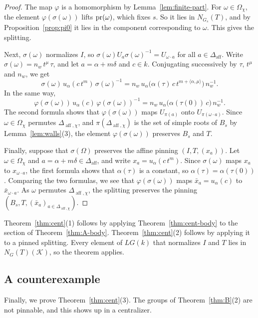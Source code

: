 \documentclass[psamsfonts]{amsart}
\theoremstyle{definition}
\theoremstyle{remark}
\numberwithin{equation}{section}
\DeclareMathOperator{\aff}{aff}
\newcommand\cK{\mathcal{K}}
\numberwithin{equation}{section}
\newcommand{\om}{\omega}
\newcommand{\Om}{\Omega}
\newcommand\pr{\textup{pr}}
\newcommand{\Daff}{\Delta_{\aff}}
\theoremstyle{plain}
\begin{document}
\begin{proof}
The map $\varphi$ is a homomorphism by Lemma~\ref{lem:finite-part}. For $\om\in\Om_\chi$, the element $\varphi(\sigma(\om))$ lifts $\pr(\om)$, which fixes $s$. So it lies in $N_{G_s}(T)$, and by Proposition~\ref{prop:pi0} it lies in the component corresponding to $\om$. This gives the splitting.

Next, $\sigma(\om)$ normalizes $I$, so $\sigma(\om)U_a\sigma(\om)^{-1}=U_{\om\cdot a}$ for all $a\in\Daff$. Write $\sigma(\om)=n_w\,t^{\mu}\,\tau$, and let $a=\alpha+m\delta$ and $c\in k$. Conjugating successively by $\tau$, $t^{\mu}$ and $n_w$, we get
\[
\sigma(\om)\,u_\alpha(c\,t^m)\,\sigma(\om)^{-1}=n_w\,u_\alpha\big(\alpha(\tau)\,c\,t^{m+\langle\alpha,\mu\rangle}\big)\,n_w^{-1}.
\]
In the same way,
\[
\varphi(\sigma(\om))\,u_\alpha(c)\,\varphi(\sigma(\om))^{-1}=n_w\,u_\alpha\big(\alpha(\tau(0))\,c\big)\,n_w^{-1}.
\]
The second formula shows that $\varphi(\sigma(\om))$ maps $U_{\pi(a)}$ onto $U_{\pi(\om\cdot a)}$. Since $\om\in\Om_\chi$ permutes $\Delta_{\aff,\chi}$, and $\pi(\Delta_{\aff,\chi})$ is the set of simple roots of $B_s$ by Lemma~\ref{lem:walls}(3), the element $\varphi(\sigma(\om))$ preserves $B_s$ and $T$.

Finally, suppose that $\sigma(\Om)$ preserves the affine pinning $(I,T,(x_a))$. Let $\om\in\Om_\chi$ and $a=\alpha+m\delta\in\Daff$, and write $x_a=u_\alpha(c\,t^m)$. Since $\sigma(\om)$ maps $x_a$ to $x_{\om\cdot a}$, the first formula shows that $\alpha(\tau)$ is a constant, so $\alpha(\tau)=\alpha(\tau(0))$. Comparing the two formulas, we see that $\varphi(\sigma(\om))$ maps $\bar x_a=u_\alpha(c)$ to $\bar x_{\om\cdot a}$. As $\om$ permutes $\Delta_{\aff,\chi}$, the splitting preserves the pinning $(B_s,T,(\bar x_a)_{a\in\Delta_{\aff,\chi}})$.
\end{proof}

Theorem~\ref{thm:cent}(1) follows by applying Theorem~\ref{thm:cent-body} to the section of Theorem~\ref{thm:A-body}. Theorem~\ref{thm:cent}(2) follows by applying it to a pinned splitting. Every element of $LG(k)$ that normalizes $I$ and $T$ lies in $N_G(T)(\cK)$, so the theorem applies.

\subsection{A counterexample}
Finally, we prove Theorem~\ref{thm:cent}(3). The groups of Theorem~\ref{thm:B}(2) are not pinnable, and this shows up in a centralizer.
\end{document}
